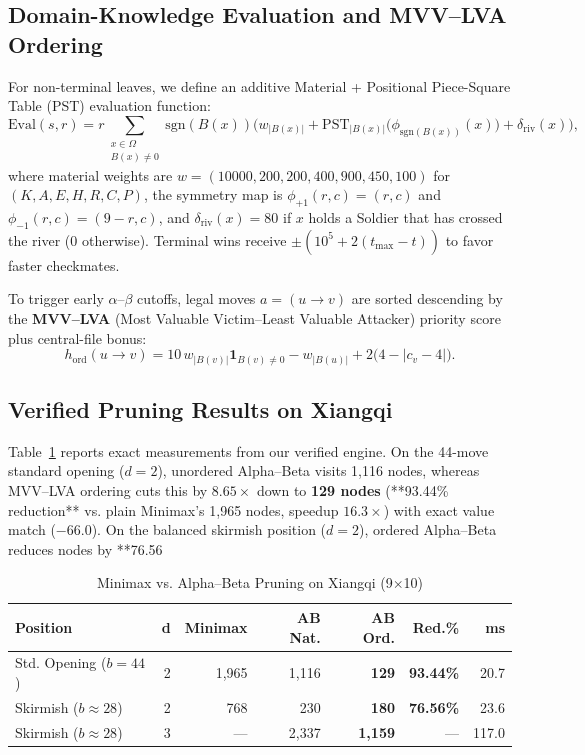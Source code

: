 \documentclass[conference]{IEEEtran}
\begin{document}
\subsection{Domain-Knowledge Evaluation and MVV--LVA Ordering}
For non-terminal leaves, we define an additive Material + Positional Piece-Square Table (PST) evaluation function:
\begin{equation}
\mathrm{Eval}(s, r) = r \sum_{\substack{x \in \Omega \\ B(x) \neq 0}} \mathrm{sgn}(B(x)) \Big( w_{|B(x)|} + \mathrm{PST}_{|B(x)|}\big(\phi_{\mathrm{sgn}(B(x))}(x)\big) + \delta_{\text{riv}}(x) \Big),
\label{eq:xq_eval}
\end{equation}
where material weights are $w = (10000, 200, 200, 400, 900, 450, 100)$ for $(K,A,E,H,R,C,P)$, the symmetry map is $\phi_{+1}(r,c)=(r,c)$ and $\phi_{-1}(r,c)=(9-r,c)$, and $\delta_{\text{riv}}(x) = 80$ if $x$ holds a Soldier that has crossed the river ($0$ otherwise). Terminal wins receive $\pm(10^5 + 2(t_{\max} - t))$ to favor faster checkmates.

To trigger early $\alpha$--$\beta$ cutoffs, legal moves $a=(u \to v)$ are sorted descending by the \textbf{MVV--LVA} (Most Valuable Victim--Least Valuable Attacker) priority score plus central-file bonus:
\begin{equation}
h_{\text{ord}}(u \to v) = 10\,w_{|B(v)|}\mathbf{1}_{B(v)\neq 0} - w_{|B(u)|} + 2\big(4 - |c_v - 4|\big).
\end{equation}

\subsection{Verified Pruning Results on Xiangqi}
Table~\ref{tab:xq_ab} reports exact measurements from our verified engine. On the 44-move standard opening ($d=2$), unordered Alpha--Beta visits 1,116 nodes, whereas MVV--LVA ordering cuts this by $8.65\times$ down to \textbf{129 nodes} (**93.44\% reduction** vs. plain Minimax's 1,965 nodes, speedup $16.3\times$) with exact value match ($-66.0$). On the balanced skirmish position ($d=2$), ordered Alpha--Beta reduces nodes by **76.56%

\begin{table}[t]
\centering
\caption{Minimax vs. Alpha--Beta Pruning on Xiangqi (9$\times$10)}
\label{tab:xq_ab}
\begin{tabular}{@{}lrrrrrr@{}}
\toprule
\textbf{Position} & \textbf{d} & \textbf{Minimax} & \textbf{AB Nat.} & \textbf{AB Ord.} & \textbf{Red.\%} & \textbf{ms} \\
\midrule
Std. Opening ($b{=}44$) & 2 & 1,965 & 1,116 & \textbf{129} & \textbf{93.44\%} & 20.7 \\
Skirmish ($b{\approx}28$) & 2 & 768 & 230 & \textbf{180} & \textbf{76.56\%} & 23.6 \\
Skirmish ($b{\approx}28$) & 3 & --- & 2,337 & \textbf{1,159} & --- & 117.0 \\
\bottomrule
\end{tabular}
\end{table}
\end{document}
